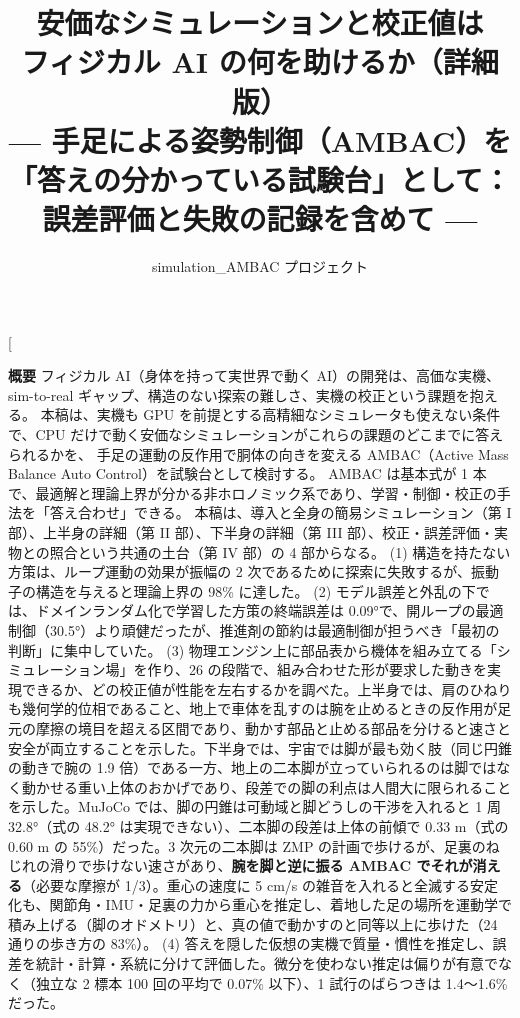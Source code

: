 \documentclass[paper=a4paper,fontsize=10pt,twocolumn,column_gap=2zw,line_length=24zw,number_of_lines=46,head_space=20mm]{jlreq}
\title{\textbf{安価なシミュレーションと校正値は\\フィジカル AI の何を助けるか（詳細版）}\\[0.3em]
\large --- 手足による姿勢制御（AMBAC）を「答えの分かっている試験台」として：\\誤差評価と失敗の記録を含めて ---}
\author{simulation\_AMBAC プロジェクト}
\date{\fpversion}
\begin{document}
\twocolumn[
\begin{@twocolumnfalse}
\maketitle
\vspace{-1.5em}
\begin{center}\begin{minipage}{0.9\textwidth}\small
\textbf{概要}\quad
フィジカル AI（身体を持って実世界で動く AI）の開発は、高価な実機、sim-to-real ギャップ、構造のない探索の難しさ、実機の校正という課題を抱える。
本稿は、実機も GPU を前提とする高精細なシミュレータも使えない条件で、CPU だけで動く安価なシミュレーションがこれらの課題のどこまでに答えられるかを、
手足の運動の反作用で胴体の向きを変える AMBAC（Active Mass Balance Auto Control）を試験台として検討する。
AMBAC は基本式が 1 本で、最適解と理論上界が分かる非ホロノミック系であり、学習・制御・校正の手法を「答え合わせ」できる。
本稿は、導入と全身の簡易シミュレーション（第 I 部）、上半身の詳細（第 II 部）、下半身の詳細（第 III 部）、校正・誤差評価・実物との照合という共通の土台（第 IV 部）の 4 部からなる。
(1) 構造を持たない方策は、ループ運動の効果が振幅の 2 次であるために探索に失敗するが、振動子の構造を与えると理論上界の 98\% に達した。
(2) モデル誤差と外乱の下では、ドメインランダム化で学習した方策の終端誤差は 0.09°で、開ループの最適制御（30.5°）より頑健だったが、推進剤の節約は最適制御が担うべき「最初の判断」に集中していた。
(3) 物理エンジン上に部品表から機体を組み立てる「シミュレーション場」を作り、26 の段階で、組み合わせた形が要求した動きを実現できるか、どの校正値が性能を左右するかを調べた。上半身では、肩のひねりも幾何学的位相であること、地上で車体を乱すのは腕を止めるときの反作用が足元の摩擦の境目を超える区間であり、動かす部品と止める部品を分けると速さと安全が両立することを示した。下半身では、宇宙では脚が最も効く肢（同じ円錐の動きで腕の 1.9 倍）である一方、地上の二本脚が立っていられるのは脚ではなく動かせる重い上体のおかげであり、段差での脚の利点は人間大に限られることを示した。MuJoCo では、脚の円錐は可動域と脚どうしの干渉を入れると 1 周 32.8°（式の 48.2° は実現できない）、二本脚の段差は上体の前傾で 0.33 m（式の 0.60 m の 55\%）だった。3 次元の二本脚は ZMP の計画で歩けるが、足裏のねじれの滑りで歩けない速さがあり、\textbf{腕を脚と逆に振る AMBAC でそれが消える}（必要な摩擦が 1/3）。重心の速度に 5 cm/s の雑音を入れると全滅する安定化も、関節角・IMU・足裏の力から重心を推定し、着地した足の場所を運動学で積み上げる（脚のオドメトリ）と、真の値で動かすのと同等以上に歩けた（24 通りの歩き方の 83\%）。
(4) 答えを隠した仮想の実機で質量・慣性を推定し、誤差を統計・計算・系統に分けて評価した。微分を使わない推定は偏りが有意でなく（独立な 2 標本 100 回の平均で 0.07\% 以下）、1 試行のばらつきは 1.4〜1.6\% だった。

\end{minipage}
\end{center}
\end{@twocolumnfalse}
\end{document}
